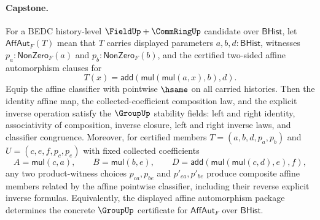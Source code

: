 \paragraph{Capstone.}

\begin{theorem}
\label{thm:field-affine-automorphism-group-certificate}
For a BEDC history-level $\FieldUp+\CommRingUp$ candidate over
$\mathsf{BHist}$, let $\mathsf{AffAut}_F(T)$ mean that $T$ carries displayed
parameters $a,b,d:\mathsf{BHist}$, witnesses
$p_a:\mathsf{NonZero}_F(a)$ and $p_b:\mathsf{NonZero}_F(b)$, and the certified
two-sided affine automorphism clauses for
$$
T(x)=\mathsf{add}(\mathsf{mul}(\mathsf{mul}(a,x),b),d).
$$
Equip the affine classifier with pointwise $\hsame$ on all carried histories.
Then the identity affine map, the collected-coefficient composition law, and
the explicit inverse operation satisfy the $\GroupUp$ stability fields: left
and right identity, associativity of composition, inverse closure, left and
right inverse laws, and classifier congruence. Moreover, for certified members
$T=(a,b,d,p_a,p_b)$ and $U=(c,e,f,p_c,p_e)$ with fixed collected coefficients
$$
A=\mathsf{mul}(c,a),
\qquad
B=\mathsf{mul}(b,e),
\qquad
D=\mathsf{add}(\mathsf{mul}(\mathsf{mul}(c,d),e),f),
$$
any two product-witness choices $p_{ca},p_{be}$ and $p'_{ca},p'_{be}$ produce
composite affine members related by the affine pointwise classifier, including
their reverse explicit inverse formulas. Equivalently, the displayed affine
automorphism package determines the concrete $\GroupUp$ certificate for
$\mathsf{AffAut}_F$ over $\mathsf{BHist}$.
\end{theorem}
